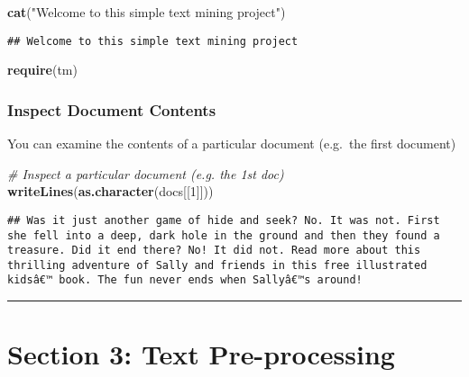 \documentclass[
]{article}
\newenvironment{Shaded}{\begin{snugshade}}{\end{snugshade}}
\newcommand{\CommentTok}[1]{\textcolor[rgb]{0.56,0.35,0.01}{\textit{#1}}}
\newcommand{\DecValTok}[1]{\textcolor[rgb]{0.00,0.00,0.81}{#1}}
\newcommand{\KeywordTok}[1]{\textcolor[rgb]{0.13,0.29,0.53}{\textbf{#1}}}
\newcommand{\NormalTok}[1]{#1}
\newcommand{\StringTok}[1]{\textcolor[rgb]{0.31,0.60,0.02}{#1}}
\begin{document}
\begin{Shaded}
\begin{Highlighting}[]
\KeywordTok{cat}\NormalTok{(}\StringTok{"Welcome to this simple text mining project"}\NormalTok{)}
\end{Highlighting}
\end{Shaded}

\begin{verbatim}
## Welcome to this simple text mining project
\end{verbatim}

\begin{Shaded}
\begin{Highlighting}[]
\KeywordTok{require}\NormalTok{(tm)}
\end{Highlighting}
\end{Shaded}

\hypertarget{inspect-document-contents}{%
\subsubsection{Inspect Document
Contents}\label{inspect-document-contents}}

You can examine the contents of a particular document (e.g.~the first
document)

\begin{Shaded}
\begin{Highlighting}[]
\CommentTok{# Inspect a particular document (e.g. the 1st doc)}
\KeywordTok{writeLines}\NormalTok{(}\KeywordTok{as.character}\NormalTok{(docs[[}\DecValTok{1}\NormalTok{]]))}
\end{Highlighting}
\end{Shaded}

\begin{verbatim}
## Was it just another game of hide and seek? No. It was not. First she fell into a deep, dark hole in the ground and then they found a treasure. Did it end there? No! It did not. Read more about this thrilling adventure of Sally and friends in this free illustrated kidsâ€™ book. The fun never ends when Sallyâ€™s around!
\end{verbatim}

\begin{center}\rule{0.5\linewidth}{0.5pt}\end{center}

\hypertarget{section-3-text-pre-processing}{%
\section{Section 3: Text
Pre-processing}\label{section-3-text-pre-processing}}
\end{document}
